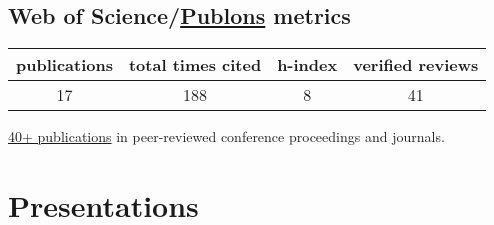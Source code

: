 \documentclass[a4paper,online,extended]{adcv}
\begin{document}
\subsection*{Web of Science/\href{https://publons.com/researcher/ABA-1884-2020/}{Publons} metrics}
\begin{tabular}{cccc}
 publications    & total times cited & h-index & verified reviews \\
\midrule
17 & 188 & 8 & 41
\end{tabular}
\vspace{-.3cm}
\ifextended
  \begin{refsection}
    \nocite{Albarelli2016a}
    \nocite{Rossi2016}
    \nocite{Albarelli2016}
    \nocite{Albarelli2017}
    \nocite{Albarelli2017a}
    \nocite{Albarelli2018}
    \nocite{Albarelli2018a}
    \nocite{Albarelli2018c}
    \nocite{Adnane2019}
    \nocite{Adnane2019a}
    \nocite{Albarelli2019a}
    \nocite{Albarelli2019}
    \nocite{Seveso2019}
    \nocite{Albarelli2019c}
    \nocite{Predko2020}
    \nocite{Tsang2019}
    \nocite{Rossi2020}
    \nocite{Gianani2020}
    \printbibliography[title={International peer-reviewed journals}, heading=subbibliography]
  \end{refsection}
\vspace{-.3cm}
  \begin{refsection}
    \nocite{Albarelli2019d}
    \nocite{Albarelli2018b}
    \printbibliography[title={Conference proceedings}, heading=subbibliography]
  \end{refsection}
\vspace{-.3cm}
  \begin{refsection}
    \nocite{Friel2020}
    \printbibliography[title={Preprints}, heading=subbibliography]
  \end{refsection}

\else
  \href{https://scholar.google.com/citations?user=s1bqnpoAAAAJ}{40+ publications} in peer-reviewed conference proceedings and journals.
\fi

\ifextended
  \section{Presentations}
  \vspace{-.3cm}
\end{document}

